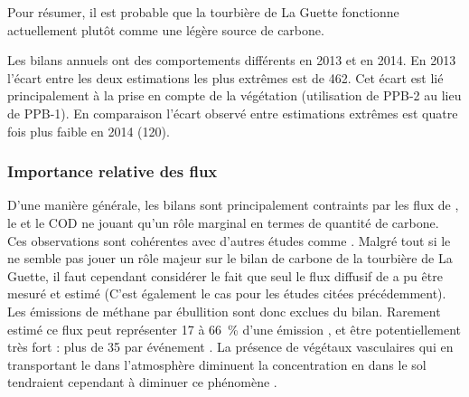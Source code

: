 Pour résumer, il est probable que la tourbière de La Guette fonctionne actuellement plutôt comme une légère source de carbone.


Les bilans annuels ont des comportements différents en 2013 et en 2014.
En 2013 l'écart entre les deux estimations les plus extrêmes est de \SI{462}{\gcm}.
Cet écart est lié principalement à la prise en compte de la végétation (utilisation de PPB-2 au lieu de PPB-1).
En comparaison l'écart observé entre estimations extrêmes est quatre fois plus faible en 2014 (\SI{120}{\gcm}).


\subsubsection{Importance relative des flux}

D'une manière générale, les bilans sont principalement contraints par les flux de \coo, le \chh et le COD ne jouant qu'un rôle marginal en termes de quantité de carbone.
Ces observations sont cohérentes avec d'autres études comme \citet{bortoluzzi2006a,worrall2009}.
Malgré tout si le \chh ne semble pas jouer un rôle majeur sur le bilan de carbone de la tourbière de La Guette, il faut cependant considérer le fait que seul le flux diffusif de \chh a pu être mesuré et estimé (C'est également le cas pour les études citées précédemment).
Les émissions de méthane par ébullition sont donc exclues du bilan.
Rarement estimé ce flux peut représenter 17 à \SI{66}{\percent} d'une émission \citep{gogo2011a,christensen2003}, et être potentiellement très fort : plus de \SI{35}{\gcm} par événement \citep{glaser2009}.
La présence de végétaux vasculaires qui en transportant le \chh dans l'atmosphère diminuent la concentration en \chh dans le sol tendraient cependant à diminuer ce phénomène \citep{chanton2005}.



